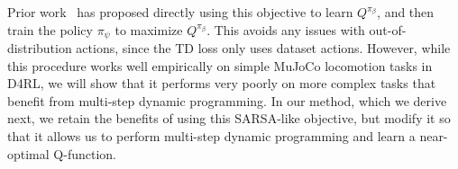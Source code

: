 \documentclass{article} %
\begin{document}
Prior work~\citep{brandfonbrener2021offline, gulcehre2021regularized, peng2019advantage}
has proposed directly using this objective to learn $Q^{\pi_\beta}$, and then train the policy $\pi_\psi$ to maximize $Q^{\pi_\beta}$. This avoids any issues with out-of-distribution actions, since the TD loss only uses dataset actions. However, while this procedure works well empirically on simple MuJoCo locomotion tasks in D4RL, we will show that it performs very poorly on more complex tasks that benefit from multi-step dynamic programming. In our method, which we derive next, we retain the benefits of using this SARSA-like objective, but modify it so that it allows us to perform multi-step dynamic programming and learn a near-optimal Q-function.
\end{document}
